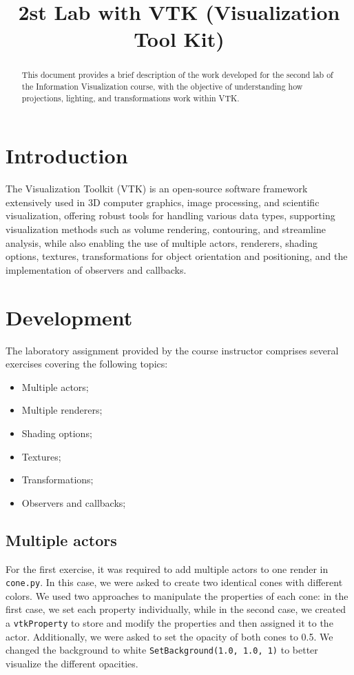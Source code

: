 \documentclass[10pt,conference]{IEEEtran}
\title{2st Lab with VTK (Visualization Tool Kit)}
\author{
\IEEEauthorblockN{João Varela, 113780}
\IEEEauthorblockN{Carolina Prata, 114246}
\IEEEauthorblockA{Information Visualization, 2025\\
MSc in Computer Engineering, University of Aveiro}
}
\begin{document}
\maketitle

\begin{abstract}
This document provides a brief description of the work developed for the second lab of the Information Visualization course, with the objective of understanding how projections, lighting, and transformations work within VTK.
\end{abstract}

\section{Introduction}
The Visualization Toolkit (VTK) is an open-source software framework extensively used in 3D computer graphics, image processing, and scientific visualization, offering robust tools for handling various data types, supporting visualization methods such as volume rendering, contouring, and streamline analysis, while also enabling the use of multiple actors, renderers, shading options, textures, transformations for object orientation and positioning, and the implementation of observers and callbacks.

\section{Development}

The laboratory assignment provided by the course instructor comprises several exercises covering the following topics:

\begin{itemize}
    \item Multiple actors;
    \item Multiple renderers;
    \item Shading options;
    \item Textures;
    \item Transformations;
    \item Observers and callbacks;
\end{itemize}


\subsection{Multiple actors}
For the first exercise, it was required to add multiple actors to one render in \texttt{cone.py}. In this case, we were asked to create two identical cones with different colors. We used two approaches to manipulate the properties of each cone: in the first case, we set each property individually, while in the second case, we created a \texttt{vtkProperty} to store and modify the properties and then assigned it to the actor. Additionally, we were asked to set the opacity of both cones to 0.5.
We changed the background to white \texttt{SetBackground(1.0, 1.0, 1)} to better visualize the different opacities.
\end{document}

